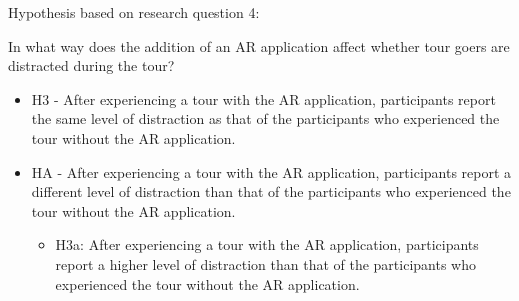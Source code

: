 Hypothesis based on research question 4:

In what way does the addition of an AR application affect whether tour goers are distracted during the tour?

\begin{itemize}
\item H3 - After experiencing a tour with the AR application, participants report the same level of distraction as that of the participants who experienced the tour without the AR application. 
\item HA - After experiencing a tour with the AR application, participants report a different level of distraction than that of the participants who experienced the tour without the AR application.
\begin{itemize}
\item H3a: After experiencing a tour with the AR application, participants report a higher level of distraction than that of the participants who experienced the tour without the AR application.
\end{itemize}
\end{itemize}